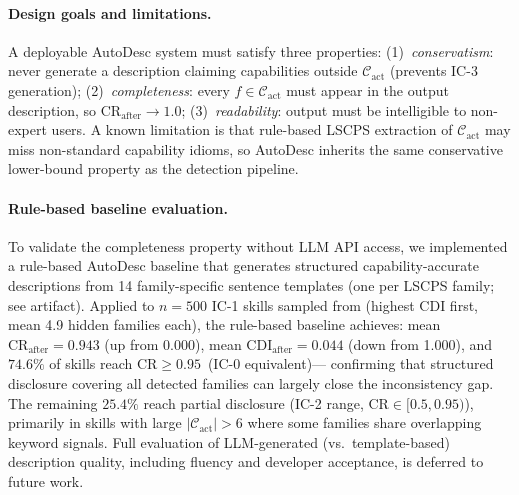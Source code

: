 \paragraph{Design goals and limitations.}
A deployable AutoDesc system must satisfy three properties:
(1)~\emph{conservatism}: never generate a description claiming capabilities
outside $\mathcal{C}_{\text{act}}$ (prevents IC-3 generation);
(2)~\emph{completeness}: every $f \in \mathcal{C}_{\text{act}}$ must appear
in the output description, so $\text{CR}_{\text{after}} \to 1.0$;
(3)~\emph{readability}: output must be intelligible to non-expert users.
A known limitation is that rule-based LSCPS extraction of $\mathcal{C}_{\text{act}}$
may miss non-standard capability idioms, so AutoDesc inherits the same
conservative lower-bound property as the detection pipeline.

\paragraph{Rule-based baseline evaluation.}
To validate the completeness property without LLM API access,
we implemented a rule-based AutoDesc baseline that generates
structured capability-accurate descriptions from 14 family-specific
sentence templates (one per LSCPS family; see artifact).
Applied to $n{=}500$ IC-1 skills sampled from \clawhub{}
(highest CDI first, mean 4.9 hidden families each),
the rule-based baseline achieves:
mean $\text{CR}_{\text{after}} = 0.943$ (up from 0.000),
mean $\text{CDI}_{\text{after}} = 0.044$ (down from 1.000),
and $74.6\%$ of skills reach $\text{CR} \geq 0.95$~(IC-0 equivalent)---
confirming that structured disclosure covering all detected families
can largely close the inconsistency gap.
The remaining $25.4\%$ reach partial disclosure (IC-2 range, $\text{CR} \in [0.5, 0.95)$),
primarily in skills with large $|\mathcal{C}_{\text{act}}| > 6$
where some families share overlapping keyword signals.
Full evaluation of LLM-generated (vs.\ template-based) description quality,
including fluency and developer acceptance, is deferred to future work.



